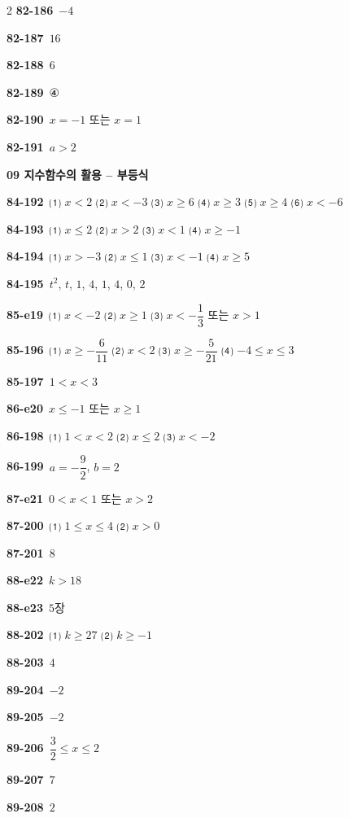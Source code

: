 \documentclass[10pt,a4paper]{article}
\begin{document}
\begin{multicols}{2}
\noindent\textbf{82-186}\ $-4$\par
\noindent\textbf{82-187}\ $16$\par
\noindent\textbf{82-188}\ $6$\par
\noindent\textbf{82-189}\ ④\par
\noindent\textbf{82-190}\ $x=-1$ 또는 $x=1$\par
\noindent\textbf{82-191}\ $a>2$\par
\noindent\textbf{09 지수함수의 활용 – 부등식}\par\smallskip
\noindent\textbf{84-192}\ ⑴ $x<2$ ⑵ $x<-3$ ⑶ $x\ge 6$ ⑷ $x\ge 3$ ⑸ $x\ge 4$ ⑹ $x<-6$\par
\noindent\textbf{84-193}\ ⑴ $x\le 2$ ⑵ $x>2$ ⑶ $x<1$ ⑷ $x\ge -1$\par
\noindent\textbf{84-194}\ ⑴ $x>-3$ ⑵ $x\le 1$ ⑶ $x<-1$ ⑷ $x\ge 5$\par
\noindent\textbf{84-195}\ $t^{2}$, $t$, $1$, $4$, $1$, $4$, $0$, $2$\par
\noindent\textbf{85-e19}\ ⑴ $x<-2$ ⑵ $x\ge 1$ ⑶ $x<-\dfrac{1}{3}$ 또는 $x>1$\par
\noindent\textbf{85-196}\ ⑴ $x\ge -\dfrac{6}{11}$ ⑵ $x<2$ ⑶ $x\ge -\dfrac{5}{21}$ ⑷ $-4\le x\le 3$\par
\noindent\textbf{85-197}\ $1<x<3$\par
\noindent\textbf{86-e20}\ $x\le -1$ 또는 $x\ge 1$\par
\noindent\textbf{86-198}\ ⑴ $1<x<2$ ⑵ $x\le 2$ ⑶ $x<-2$\par
\noindent\textbf{86-199}\ $a=-\dfrac{9}{2}$, $b=2$\par
\noindent\textbf{87-e21}\ $0<x<1$ 또는 $x>2$\par
\noindent\textbf{87-200}\ ⑴ $1\le x\le 4$ ⑵ $x>0$\par
\noindent\textbf{87-201}\ $8$\par
\noindent\textbf{88-e22}\ $k>18$\par
\noindent\textbf{88-e23}\ $5$장\par
\noindent\textbf{88-202}\ ⑴ $k\ge 27$ ⑵ $k\ge -1$\par
\noindent\textbf{88-203}\ $4$\par
\noindent\textbf{89-204}\ $-2$\par
\noindent\textbf{89-205}\ $-2$\par
\noindent\textbf{89-206}\ $\dfrac{3}{2}\le x\le 2$\par
\noindent\textbf{89-207}\ $7$\par
\noindent\textbf{89-208}\ $2$\par

\end{multicols}
\end{document}
